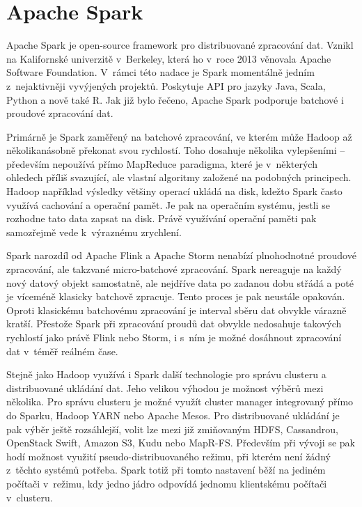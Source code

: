\documentclass[thesis=B,czech]{FITthesis}[2012/06/26]
\begin{document}
	
\section{Apache Spark}
	Apache Spark je open-source framework pro distribuované zpracování dat. Vznikl na Kalifornské univerzitě v~Berkeley, která ho v~roce 2013 věnovala Apache Software Foundation. V~rámci této nadace je Spark momentálně jedním z~nejaktivněji vyvýjených projektů\cite{spark-toplevel}. Poskytuje API pro jazyky Java, Scala, Python a nově také R. Jak již bylo řečeno, Apache Spark podporuje batchové i proudové zpracování dat. 
	
	Primárně je Spark zaměřený na batchové zpracování, ve kterém může Hadoop až několikanásobně překonat svou rychlostí. Toho dosahuje několika vylepšeními -- především nepoužívá přímo MapReduce paradigma, které je v~některých ohledech příliš svazující, ale vlastní algoritmy založené na podobných principech. Hadoop například výsledky většiny operací ukládá na disk, kdežto Spark často využívá cachování a operační pamět. Je pak na operačním systému, jestli se rozhodne tato data zapsat na disk\cite{spark-mapreduce-difference}. Právě využívání operační paměti pak samozřejmě vede k~výraznému zrychlení. 
		
	Spark narozdíl od Apache Flink a Apache Storm nenabízí plnohodnotné proudové zpracování, ale takzvané micro-batchové zpracování. Spark nereaguje na každý nový datový objekt samostatně, ale nejdříve data po zadanou dobu střádá a poté je víceméně klasicky batchově zpracuje. Tento proces je pak neustále opakován. Oproti klasickému batchovému zpracování je interval sběru dat obvykle várazně kratší.  Přestože Spark při zpracování proudů dat obvykle nedosahuje takových rychlostí jako právě Flink nebo Storm, i s~ním je možné dosáhnout zpracování dat v~téměř reálném čase\cite{streaming-benchmark}. 

	Stejně jako Hadoop využívá i Spark další technologie pro správu clusteru a distribuované ukládání dat. Jeho velikou výhodou je možnost výběrů mezi několika. Pro správu clusteru je možné využít cluster manager integrovaný přímo do Sparku, Hadoop YARN nebo Apache Mesos. Pro distribuované ukládání je pak výběr ještě rozsáhlejší, volit lze mezi již zmiňovaným HDFS, Cassandrou, OpenStack Swift, Amazon S3, Kudu nebo MapR-FS. Především při vývoji se pak hodí možnost využití pseudo-distribuovaného režimu, při kterém není žádný z~těchto systémů potřeba. Spark totiž při tomto nastavení běží na jediném počítači v~režimu, kdy jedno jádro odpovídá jednomu klientskému počítači v~clusteru. 
\end{document}
